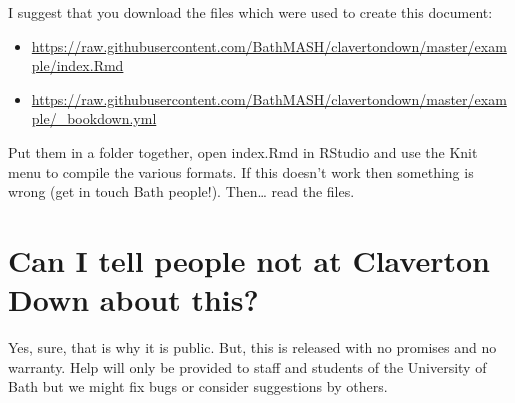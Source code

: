 \documentclass[
  12pt,
  a4paper]{extarticle}
\providecommand{\tightlist}{%
  \setlength{\itemsep}{0pt}\setlength{\parskip}{0pt}}
\theoremstyle{plain}
\theoremstyle{definition}
\theoremstyle{plain}
\theoremstyle{plain}
\theoremstyle{plain}
\theoremstyle{plain}
\theoremstyle{definition}
\theoremstyle{definition}
\theoremstyle{remark}
\theoremstyle{remark}
\renewcommand{\;}{\,}
\begin{document}
I suggest that you download the files which were used to create this document:

\begin{itemize}
\tightlist
\item
  \url{https://raw.githubusercontent.com/BathMASH/clavertondown/master/example/index.Rmd}
\item
  \url{https://raw.githubusercontent.com/BathMASH/clavertondown/master/example/_bookdown.yml}
\end{itemize}

Put them in a folder together, open index.Rmd in RStudio and use the Knit menu to compile the various formats. If this doesn't work then something is wrong (get in touch Bath people!). Then\ldots{} read the files.

\hypertarget{can-i-tell-people-not-at-claverton-down-about-this}{%
\section{Can I tell people not at Claverton Down about this?}\label{can-i-tell-people-not-at-claverton-down-about-this}}

Yes, sure, that is why it is public. But, this is released with no promises and no warranty. Help will only be provided to staff and students of the University of Bath but we might fix bugs or consider suggestions by others.
\end{document}
